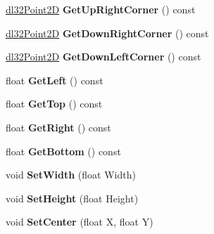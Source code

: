 \begin{DoxyCompactItemize}
\item 
\hypertarget{classdl32_a_a_b_b2_d_a1369786fd9296f1e6e93e5d72db15e65}{\hyperlink{structdl32_point2_d}{dl32\-Point2\-D} {\bfseries Get\-Up\-Right\-Corner} () const }\label{classdl32_a_a_b_b2_d_a1369786fd9296f1e6e93e5d72db15e65}

\item 
\hypertarget{classdl32_a_a_b_b2_d_aabc34e526f8913a6cbbc527c7f2781a4}{\hyperlink{structdl32_point2_d}{dl32\-Point2\-D} {\bfseries Get\-Down\-Right\-Corner} () const }\label{classdl32_a_a_b_b2_d_aabc34e526f8913a6cbbc527c7f2781a4}

\item 
\hypertarget{classdl32_a_a_b_b2_d_a41e70dff069773580c3ddf38fd01523a}{\hyperlink{structdl32_point2_d}{dl32\-Point2\-D} {\bfseries Get\-Down\-Left\-Corner} () const }\label{classdl32_a_a_b_b2_d_a41e70dff069773580c3ddf38fd01523a}

\item 
\hypertarget{classdl32_a_a_b_b2_d_aebc3da3616e3f2e6e8f4c2a1d2301c37}{float {\bfseries Get\-Left} () const }\label{classdl32_a_a_b_b2_d_aebc3da3616e3f2e6e8f4c2a1d2301c37}

\item 
\hypertarget{classdl32_a_a_b_b2_d_a6f8381c7091935d57db93bbd8f25262b}{float {\bfseries Get\-Top} () const }\label{classdl32_a_a_b_b2_d_a6f8381c7091935d57db93bbd8f25262b}

\item 
\hypertarget{classdl32_a_a_b_b2_d_a1f683484dbf53e2b2bbfe0c5a0d637ab}{float {\bfseries Get\-Right} () const }\label{classdl32_a_a_b_b2_d_a1f683484dbf53e2b2bbfe0c5a0d637ab}

\item 
\hypertarget{classdl32_a_a_b_b2_d_af524128d9b273e7db87bfcfb5061cdd6}{float {\bfseries Get\-Bottom} () const }\label{classdl32_a_a_b_b2_d_af524128d9b273e7db87bfcfb5061cdd6}

\item 
\hypertarget{classdl32_a_a_b_b2_d_ad6e248ad6268ebbd7dcbb16557a422b7}{void {\bfseries Set\-Width} (float Width)}\label{classdl32_a_a_b_b2_d_ad6e248ad6268ebbd7dcbb16557a422b7}

\item 
\hypertarget{classdl32_a_a_b_b2_d_a882d22e65784e9d213971bf6c6d0c56b}{void {\bfseries Set\-Height} (float Height)}\label{classdl32_a_a_b_b2_d_a882d22e65784e9d213971bf6c6d0c56b}

\item 
\hypertarget{classdl32_a_a_b_b2_d_ae3c250714bcb10820e71ef03e4af46ab}{void {\bfseries Set\-Center} (float X, float Y)}\label{classdl32_a_a_b_b2_d_ae3c250714bcb10820e71ef03e4af46ab}


\end{DoxyCompactItemize}
